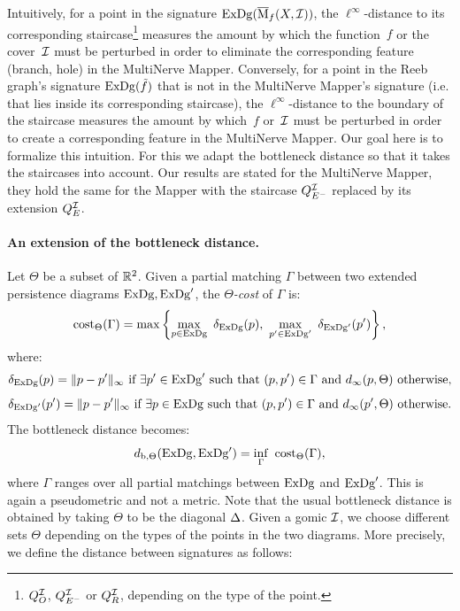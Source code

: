 Intuitively, for a point in the signature $\mathrm{ExDg}(\overline{\mathrm{M}}_f(X,\mathcal{I}))$,
the $\ell^\infty$-distance to its corresponding
staircase\footnote{$Q_O^{\mathcal{I}}$, $Q_{E^-}^{\mathcal{I}}$ or $Q_R^{\mathcal{I}}$, depending on the type of the point.}  
measures the amount by which the
function~$f$ or the cover~$\mathcal{I}$ must be perturbed in order to eliminate
the corresponding feature (branch, hole) in the MultiNerve
Mapper. Conversely, for a point in the Reeb graph's signature
$\mathrm{ExDg}(\tilde f)$ that is not in the MultiNerve Mapper's signature
(i.e. that lies inside its corresponding staircase), the
$\ell^\infty$-distance to the boundary of the staircase measures the
amount by which~$f$ or~$\mathcal{I}$ must be perturbed in order to create a
corresponding feature in the MultiNerve Mapper. Our goal here is to
formalize this intuition. For this we adapt the bottleneck distance so
that it takes the staircases into account. Our results are stated for
the MultiNerve Mapper, they hold the same for the Mapper with the
staircase $Q_{E^-}^{\mathcal{I}}$ replaced by its extension $Q_{E}^{\mathcal{I}}$.

\paragraph*{An extension of the bottleneck distance.} Let $\Theta$ be a subset of
$\mathbb{R}^2$. Given a partial matching $\Gamma$ between two extended persistence
diagrams $\mathrm{ExDg}, \mathrm{ExDg}'$, the \emph{$\Theta$-cost} of $\Gamma$ is:
%
\[
\mathrm{cost}_\Theta(\Gamma)=\max\left\{\max_{p\in \Dg}\ \delta_{\Dg}(p),\ \max_{p'\in {\Dg'}}\ \delta_{\Dg'}(p')\right\},
\]
%
where:
%
\[
\delta_{\mathrm{ExDg}}(p)=\|p-p'\|_\infty \text{ if } \exists p'\in \mathrm{ExDg}'\text{ such that }(p,p')\in\Gamma \text{ and } d_\infty(p,\Theta) \text{ otherwise},
\]
\[
\delta_{\mathrm{ExDg}'}(p')=\|p-p'\|_\infty \text{ if } \exists p\in \mathrm{ExDg}\text{ such that }(p,p')\in\Gamma \text{ and } d_\infty(p',\Theta) \text{ otherwise}.
\]
%
The bottleneck distance becomes:
%
\[
\diststair(\Dg,\Dg')=\inf_{\Gamma}\ \mathrm{cost}_\Theta(\Gamma),
\]
%
where $\Gamma$ ranges over all partial matchings between $\mathrm{ExDg}$ and
$\mathrm{ExDg}'$. This is again a pseudometric and not a metric. 
Note that the usual bottleneck distance
is obtained by taking $\Theta$ to be the diagonal $\Delta$.  
%
Given a gomic $\mathcal{I}$, we choose different sets $\Theta$ depending on the
types of the points in the two diagrams. More precisely, we define the
distance between signatures as follows:

